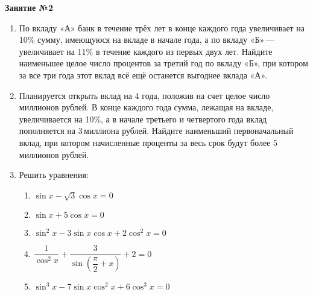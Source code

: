 \documentclass[12pt, a4paper]{article}
\begin{document}
	
   \cfoot{}
\begin{center}
	\Large
	\textbf{Занятие №2}
\end{center}
\begin{enumerate}[label=\textbf{\arabic*.}]
	\item По вкладу «А» банк в течение трёх лет в конце каждого года увеличивает на 10\% сумму, имеющуюся на вкладе в начале года, а по вкладу «Б» — увеличивает на 11\% в течение каждого из первых двух лет. Найдите наименьшее целое число процентов за третий год по вкладу «Б», при котором за все три года этот вклад всё ещё останется выгоднее вклада «А».
	\item Планируется открыть вклад на 4 года, положив на счет целое число миллионов рублей. В конце каждого года сумма, лежащая на вкладе, увеличивается на 10\%, а в начале третьего и четвертого года вклад пополняется на 3 миллиона рублей. Найдите наименьший первоначальный вклад, при котором начисленные проценты за весь срок будут более 5 миллионов рублей.
	\item Решить уравнения:
	\begin{multicols}{2}
		\begin{enumerate}[label=\asbuk*)]
			\item \( \sin x - \sqrt{3}\cos x = 0 \)
			\item \( \sin x + 5\cos x = 0 \)
			\item \( \sin^2 x - 3\sin x\cos x + 2\cos^2 x = 0 \)
			\item \( \dfrac{1}{\cos^2 x}+\dfrac{3}{\sin\left( \dfrac{\pi}{2}+x \right)}+2=0 \)
			\item \( \sin^3 x - 7\sin x \cos^2 x + 6\cos^3 x = 0 \)
		\end{enumerate}
	\end{multicols}
\end{enumerate}
\end{document}
